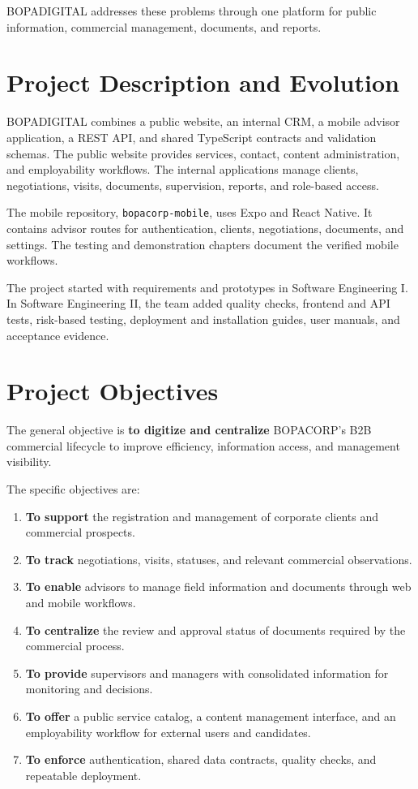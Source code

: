 \documentclass[letterpaper%
, oneside%
, 12pt%
, memoireprojet%
, english%
,creativecommons,hyperref, withAlgo2e %
]{thETS}
\begin{document}
BOPADIGITAL addresses these problems through one platform for public information, commercial management, documents, and reports.

\section{Project Description and Evolution}
BOPADIGITAL combines a public website, an internal CRM, a mobile advisor application, a REST API, and shared TypeScript contracts and validation schemas. The public website provides services, contact, content administration, and employability workflows. The internal applications manage clients, negotiations, visits, documents, supervision, reports, and role-based access.

The mobile repository, \texttt{bopacorp-mobile}, uses Expo and React Native. It contains advisor routes for authentication, clients, negotiations, documents, and settings. The testing and demonstration chapters document the verified mobile workflows.

The project started with requirements and prototypes in Software Engineering I. In Software Engineering II, the team added quality checks, frontend and API tests, risk-based testing, deployment and installation guides, user manuals, and acceptance evidence.

\section{Project Objectives}
The general objective is \textbf{to digitize and centralize} BOPACORP's B2B commercial lifecycle to improve efficiency, information access, and management visibility.

The specific objectives are:

\begin{enumerate}
    \item \textbf{To support} the registration and management of corporate clients and commercial prospects.
    \item \textbf{To track} negotiations, visits, statuses, and relevant commercial observations.
    \item \textbf{To enable} advisors to manage field information and documents through web and mobile workflows.
    \item \textbf{To centralize} the review and approval status of documents required by the commercial process.
    \item \textbf{To provide} supervisors and managers with consolidated information for monitoring and decisions.
    \item \textbf{To offer} a public service catalog, a content management interface, and an employability workflow for external users and candidates.
    \item \textbf{To enforce} authentication, shared data contracts, quality checks, and repeatable deployment.
\end{enumerate}
\end{document}
